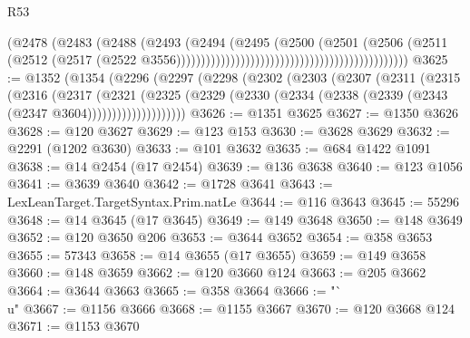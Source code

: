 \begin{lexlean}{R53}
\begin{coremodule}
                                                                        (@2478
                                                                          (@2483
                                                                            (@2488
                                                                              (@2493
                                                                                (@2494
                                                                                  (@2495
                                                                                    (@2500
                                                                                      (@2501
                                                                                        (@2506
                                                                                          (@2511
                                                                                            (@2512
                                                                                              (@2517
                                                                                                (@2522
                                                                                                  @3556)))))))))))))))))))))))))))))))))))))))))))))))
@3625 := @1352
    (@1354
      (@2296
        (@2297
          (@2298
            (@2302
              (@2303
                (@2307
                  (@2311
                    (@2315
                      (@2316
                        (@2317
                          (@2321
                            (@2325
                              (@2329
                                (@2330 (@2334 (@2338 (@2339 (@2343 (@2347 @3604))))))))))))))))))))
@3626 := @1351 @3625
@3627 := @1350 @3626
@3628 := @120 @3627
@3629 := @123 @153
@3630 := @3628 @3629
@3632 := @2291 (@1202 @3630)
@3633 := @101 @3632
@3635 := @684 @1422 @1091
@3638 := @14 @2454 (@17 @2454)
@3639 := @136 @3638
@3640 := @123 @1056
@3641 := @3639 @3640
@3642 := @1728 @3641
@3643 := LexLeanTarget.TargetSyntax.Prim.natLe
@3644 := @116 @3643
@3645 := 55296
@3648 := @14 @3645 (@17 @3645)
@3649 := @149 @3648
@3650 := @148 @3649
@3652 := @120 @3650 @206
@3653 := @3644 @3652
@3654 := @358 @3653
@3655 := 57343
@3658 := @14 @3655 (@17 @3655)
@3659 := @149 @3658
@3660 := @148 @3659
@3662 := @120 @3660 @124
@3663 := @205 @3662
@3664 := @3644 @3663
@3665 := @358 @3664
@3666 := "`\\u"
@3667 := @1156 @3666
@3668 := @1155 @3667
@3670 := @120 @3668 @124
@3671 := @1153 @3670

\end{coremodule}
\end{lexlean}
